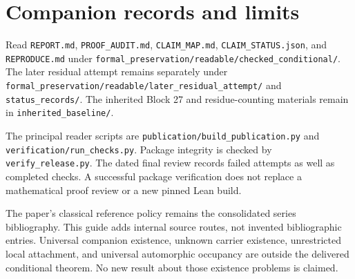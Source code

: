 \documentclass[11pt]{article}
\newcommand{\code}[1]{\nolinkurl{#1}}
\begin{document}
\clearpage
\section{Companion records and limits}
Read \code{REPORT.md}, \code{PROOF_AUDIT.md}, \code{CLAIM_MAP.md},
\code{CLAIM_STATUS.json}, and \code{REPRODUCE.md} under
\code{formal_preservation/readable/checked_conditional/}. The later residual
attempt remains separately under
\code{formal_preservation/readable/later_residual_attempt/} and
\code{status_records/}. The inherited Block 27 and residue-counting materials
remain in \code{inherited_baseline/}.

The principal reader scripts are \code{publication/build_publication.py} and
\code{verification/run_checks.py}. Package integrity is checked by
\code{verify_release.py}. The dated final review records failed attempts as well
as completed checks. A successful package verification does not replace a
mathematical proof review or a new pinned Lean build.

The paper's classical reference policy remains the consolidated series
bibliography. This guide adds internal source routes, not invented bibliographic
entries. Universal companion existence, unknown carrier existence, unrestricted
local attachment, and universal automorphic occupancy are outside the delivered
conditional theorem. No new result about those existence problems is claimed.
\end{document}
